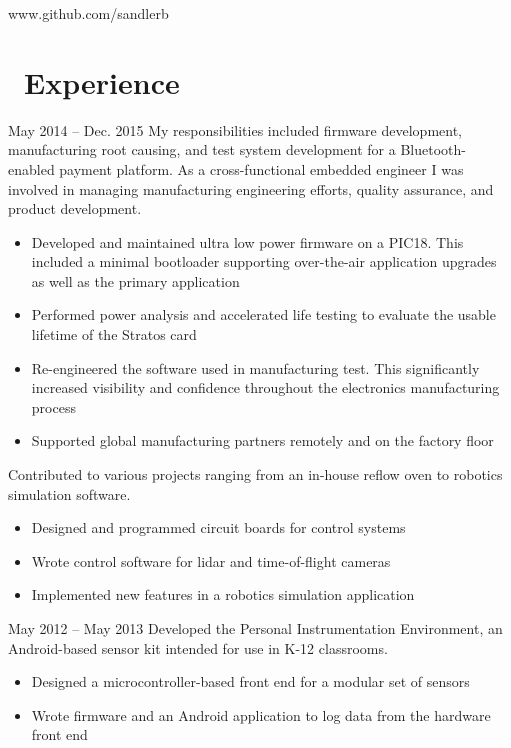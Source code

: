 \documentclass{resume}
\begin{document}


            {www.github.com/sandlerb}
 
\section{\faWrench\ Experience}
          {May 2014 -- Dec. 2015}
My responsibilities included firmware development, manufacturing
root causing, and test system development for a Bluetooth-enabled payment
platform.  As a cross-functional embedded engineer I was involved in managing
manufacturing engineering efforts, quality assurance, and product development.
\begin{itemize}
  \item Developed and maintained ultra low power firmware on a PIC18. This
      included a minimal bootloader supporting over-the-air application
      upgrades as well as the primary application
  \item Performed power analysis and accelerated life testing to evaluate the
      usable lifetime of the Stratos card
  \item Re-engineered the software used in manufacturing test. This 
      significantly increased visibility and confidence throughout the 
      electronics manufacturing process
  \item Supported global manufacturing partners remotely and on the factory floor
\end{itemize}
\vspace{3mm}

Contributed to various projects ranging from an in-house reflow oven to robotics
simulation software.
\begin{itemize}
  \item Designed and programmed circuit boards for control systems
  \item Wrote control software for lidar and time-of-flight cameras
  \item Implemented new features in a robotics simulation application
\end{itemize}
\vspace{3mm}

          {May 2012 -- May 2013}
Developed the Personal Instrumentation Environment, an Android-based sensor
kit intended for use in K-12 classrooms.
\begin{itemize}
  \item Designed a microcontroller-based front end for a modular set of sensors
  \item Wrote firmware and an Android application to log data from the hardware
      front end
\end{itemize}
\vspace{3mm}
\end{document}
